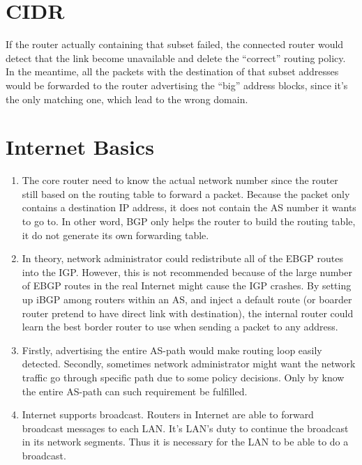 \documentclass[12pt,titlepage,letterpaper]{article}
\begin{document}
\section{CIDR}
If the router actually containing that subset failed, the connected router
would detect that the link become unavailable and delete the ``correct''
routing policy. In the meantime, all the packets with the destination of that
subset addresses would be forwarded to the router advertising the ``big''
address blocks, since it's the only matching one, which lead to the wrong
domain.

\section{Internet Basics}
\begin{enumerate}[label=\bfseries\alph*)]
    \item The core router need to know the actual network number since the
        router still based on the routing table to forward a packet. Because
        the packet only contains a destination IP address, it does not contain
        the AS number it wants to go to. In other word, BGP only helps the
        router to build the routing table, it do not generate its own
        forwarding table.
    \item In theory, network administrator could redistribute all of the EBGP
        routes into the IGP. However, this is not recommended because of the
        large number of EBGP routes in the real Internet might cause the IGP
        crashes. By setting up iBGP among routers within an AS, and inject a
        default route (or boarder router pretend to have direct link with
        destination), the internal router could learn the best border router to
        use when sending a packet to any address.
    \item Firstly, advertising the entire AS-path would make routing loop
        easily detected. Secondly, sometimes network administrator might want
        the network traffic go through specific path due to some policy
        decisions. Only by know the entire AS-path can such requirement be
        fulfilled.
    \item Internet supports broadcast.
        Routers in Internet are able to forward broadcast messages to each LAN.
        It's LAN's duty to continue the broadcast in its network segments.
        Thus it is necessary for the LAN to be able to do a broadcast.
\end{enumerate}
\end{document}
